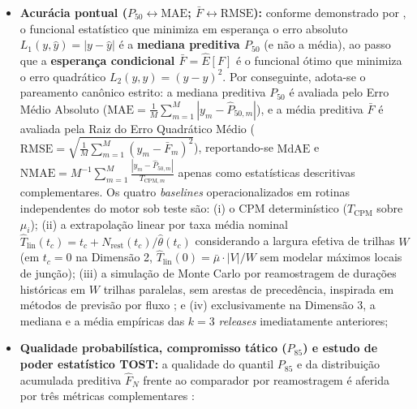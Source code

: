 \documentclass[12pt,openany,oneside,a4paper,english,brazilian,sumario=tradicional]{abntex2}
\begin{document}
\begin{itemize}
  \item \textbf{Acurácia pontual ($P_{50} \leftrightarrow \mathrm{MAE}$; $\bar{F} \leftrightarrow \mathrm{RMSE}$):} conforme demonstrado por , o funcional estatístico que minimiza em esperança o erro absoluto $L_1(y,\hat{y}) = |y - \hat{y}|$ é a \textbf{mediana preditiva $P_{50}$} (e não a média), ao passo que a \textbf{esperança condicional $\bar{F} = \hat{E}[F]$} é o funcional ótimo que minimiza o erro quadrático $L_2(y,\hat{y}) = (y - \hat{y})^2$. Por conseguinte, adota-se o pareamento canônico estrito: a mediana preditiva $P_{50}$ é avaliada pelo Erro Médio Absoluto ($\mathrm{MAE} = \frac{1}{M}\sum_{m=1}^M |y_m - \hat{P}_{50,m}|$), e a média preditiva $\bar{F}$ é avaliada pela Raiz do Erro Quadrático Médio ($\mathrm{RMSE} = \sqrt{\frac{1}{M}\sum_{m=1}^M (y_m - \bar{F}_m)^2}$), reportando-se $\mathrm{MdAE}$ e $\mathrm{NMAE} = M^{-1}\sum_{m=1}^{M}\frac{|y_m-\hat{P}_{50,m}|}{T_{\mathrm{CPM},m}}$ apenas como estatísticas descritivas complementares. Os quatro \textit{baselines} operacionalizados em rotinas independentes do motor sob teste são: (i) o CPM determinístico ($T_{\mathrm{CPM}}$ sobre $\mu_i$); (ii) a extrapolação linear por taxa média nominal $\hat{T}_{\mathrm{lin}}(t_c) = t_c + N_{\mathrm{rest}}(t_c) / \hat{\theta}(t_c)$ considerando a largura efetiva de trilhas $W$ (em $t_c=0$ na Dimensão 2, $\hat{T}_{\mathrm{lin}}(0) = \bar{\mu}\cdot |V|/W$ sem modelar máximos locais de junção); (iii) a simulação de Monte Carlo por reamostragem de durações históricas em $W$ trilhas paralelas, sem arestas de precedência, inspirada em métodos de previsão por fluxo \cite{vacanti2015}; e (iv) exclusivamente na Dimensão 3, a mediana e a média empíricas das $k=3$ \textit{releases} imediatamente anteriores;
  \item \textbf{Qualidade probabilística, compromisso tático ($P_{85}$) e estudo de poder estatístico TOST:} a qualidade do quantil $P_{85}$ e da distribuição acumulada preditiva $\hat{F}_N$ frente ao comparador por reamostragem é aferida por três métricas complementares \cite{gneiting2007,schuirmann1987}:
  \begin{enumerate}

\end{enumerate}
\end{itemize}
\end{document}
